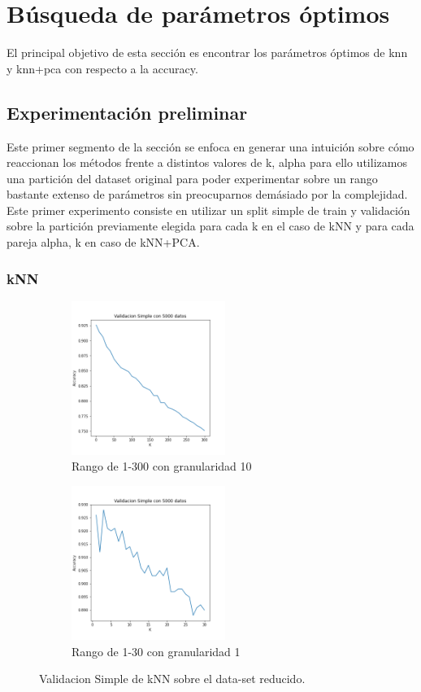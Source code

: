 \documentclass[a4paper,10pt]{article}
\title{}
\author{}
\begin{document}
\section{Búsqueda de parámetros óptimos }

El principal objetivo de esta sección es encontrar los parámetros óptimos de knn y knn+pca con respecto a la accuracy. 

\subsection{Experimentación preliminar}
Este primer segmento de la sección se enfoca en generar una intuición sobre cómo reaccionan los métodos frente a distintos valores de k, alpha para ello utilizamos una partición del dataset original para poder experimentar sobre un rango bastante extenso de parámetros sin preocuparnos demásiado por la complejidad. Este primer experimento consiste en utilizar un split simple de train y validación sobre la partición previamente elegida para cada k en el caso de kNN y para cada pareja alpha, k en caso de kNN+PCA. 

\subsubsection{kNN}

\begin{figure}[h]
\begin{subfigure}{0.5\textwidth}
\includegraphics[width=0.9\linewidth, height=5cm]{../images/validacionSimple_knnsolo.png} 
\caption{Rango de 1-300 con granularidad 10}
\label{fig:subimbar_medio1}
\end{subfigure}
\begin{subfigure}{0.5\textwidth}
\includegraphics[width=0.9\linewidth, height=5cm]{../images/validacionSimple_knnsolo_Kchicos.png} 
\caption{Rango de 1-30 con granularidad 1}
\label{fig:subimbar_medio2}
\end{subfigure}
\caption{Validacion Simple de kNN sobre el data-set reducido.}
\label{knn_preliminar}%
\end{figure}
\end{document}
